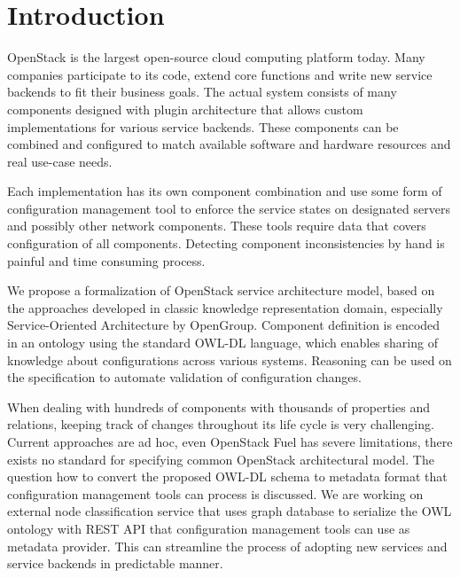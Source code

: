 
\section{Introduction}




OpenStack is the largest open-source cloud computing platform today. Many companies participate to its code, extend core functions and write new service backends to fit their business goals. The actual system consists of many components designed with plugin architecture that allows custom implementations for various service backends. These components can be combined and configured to match available software and hardware resources and real use-case needs.

Each implementation has its own component combination and use some form of configuration management tool to enforce the service states on designated servers and possibly other network components. These tools require data that covers configuration of all components. Detecting component inconsistencies by hand is painful and time consuming process.

We propose a formalization of OpenStack service architecture model, based on the approaches developed in classic knowledge representation domain, especially Service-Oriented Architecture by OpenGroup. Component definition is encoded in an ontology using the standard OWL-DL language, which enables sharing of knowledge about configurations across various systems. Reasoning can be used on the specification to automate validation of configuration changes.

When dealing with hundreds of components with thousands of properties and relations, keeping track of changes throughout its life cycle is very challenging. Current approaches are ad hoc, even OpenStack Fuel has severe limitations, there exists no standard for specifying common OpenStack architectural model. The question how to convert the proposed OWL-DL schema to metadata format that configuration management tools can process is discussed. We are working on external node classification service that uses graph database to serialize the OWL ontology with REST API that configuration management tools can use as metadata provider. This can streamline the process of adopting new services and service backends in predictable manner.

